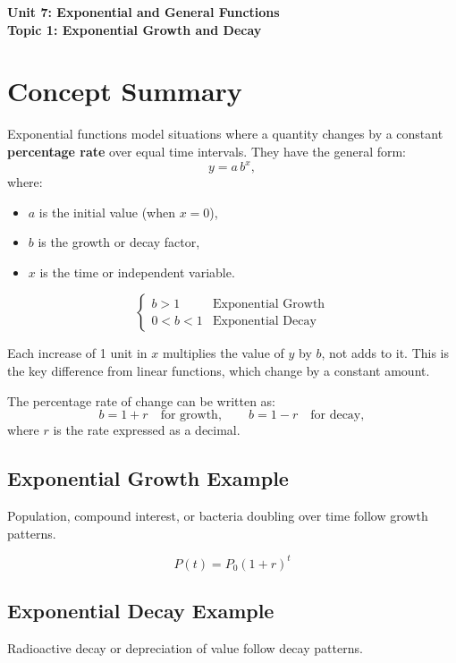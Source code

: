 \documentclass[12pt]{article}
\begin{document}
\begin{center}
    \LARGE \textbf{Unit 7: Exponential and General Functions} \\[6pt]
    \Large \textbf{Topic 1: Exponential Growth and Decay}
\end{center}

\vspace{1em}

\section*{Concept Summary}

Exponential functions model situations where a quantity changes by a constant \textbf{percentage rate} over equal time intervals.  
They have the general form:
\[
y = a \, b^x,
\]
where:
\begin{itemize}
  \item \(a\) is the initial value (when \(x = 0\)),
  \item \(b\) is the growth or decay factor,
  \item \(x\) is the time or independent variable.
\end{itemize}

\[
\begin{cases}
b > 1 & \text{Exponential Growth} \\
0 < b < 1 & \text{Exponential Decay}
\end{cases}
\]

Each increase of 1 unit in \(x\) multiplies the value of \(y\) by \(b\), not adds to it.  
This is the key difference from linear functions, which change by a constant amount.

The percentage rate of change can be written as:
\[
b = 1 + r \quad \text{for growth}, \qquad b = 1 - r \quad \text{for decay},
\]
where \(r\) is the rate expressed as a decimal.

\subsection*{Exponential Growth Example}
Population, compound interest, or bacteria doubling over time follow growth patterns.

\[
P(t) = P_0 (1 + r)^t
\]

\subsection*{Exponential Decay Example}
Radioactive decay or depreciation of value follow decay patterns.
\end{document}
